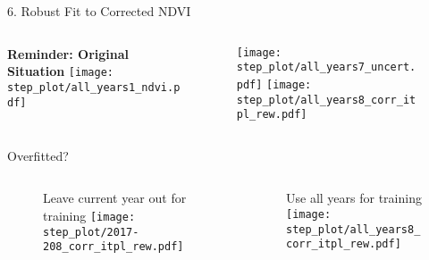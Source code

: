\begin{frame}[t]{6. Robust Fit to Corrected NDVI}
    \begin{columns}
        \begin{column}{0.45\textwidth}
            \textbf{Reminder: Original Situation}
            \texttt{[image: step\_plot/all\_years1\_ndvi.pdf]}
        \end{column}
        \begin{column}{0.45\textwidth}
            \begin{figure}
                \vspace{-1.6cm}
                \texttt{[image: step\_plot/all\_years7\_uncert.pdf]}
                \texttt{[image: step\_plot/all\_years8\_corr\_itpl\_rew.pdf]}
            \end{figure}
        \end{column}
    \end{columns}
\end{frame}

\begin{frame}[t]{Overfitted?}
    \begin{columns}
        \begin{column}{0.45\textwidth}
            \begin{figure}
                Leave current year out for training
                \texttt{[image: step\_plot/2017-208\_corr\_itpl\_rew.pdf]}
            \end{figure}
        \end{column}
        \begin{column}{0.45\textwidth}
            \begin{figure}
                Use all years for training
                \texttt{[image: step\_plot/all\_years8\_corr\_itpl\_rew.pdf]}
            \end{figure}
        \end{column}
    \end{columns}
\end{frame}